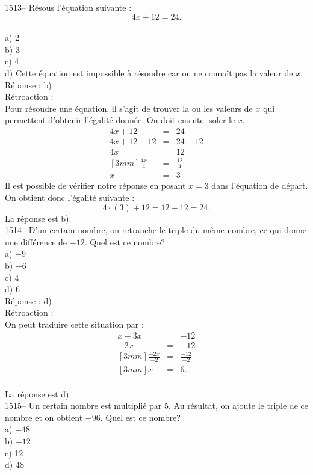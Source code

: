 1513-- R\'esous l'\'equation suivante :$$4x+12=24.$$\\
a) 2\\
b) 3\\
c) 4\\
d) Cette \'equation est impossible \`a r\'esoudre car on ne conna\^it pas la
valeur de $x$.\\

R\'eponse : b)\\

R\'etroaction :\\
Pour r\'esoudre une \'equation, il s'agit de trouver la ou les
valeurs de $x$ qui permettent d'obtenir l'\'egalit\'e donn\'ee. On
doit ensuite isoler le $x.$
\begin{eqnarray*}
4x+12&=&24 \\ 4x+12-12&=&24-12 \\ 4x &=& 12 \\  [3mm]
  \frac{4x}{4}&=&\frac{12}{4}\\[3mm]x&=&3
\end{eqnarray*}
Il est possible de v\'erifier notre r\'eponse en posant $x=3$ dans
l'\'equation de d\'epart. On obtient donc l'\'egalit\'e suivante
:$$4\cdot(3)+12=12+12=24.$$ La r\'eponse est
b).\\

1514-- D'un certain nombre, on retranche le triple du m\^eme nombre,
ce qui donne une
diff\'erence de $-12$. Quel est ce nombre?\\
a) $-9$\\
b) $-6$\\
c) 4\\
d) 6\\

R\'eponse : d)\\

R\'etroaction :\\
On peut traduire cette situation par :
\begin{eqnarray*}
x-3x&=&-12 \\ -2x&=&-12 \\ [3mm]\frac{-2x}{-2}&=& \frac{-12}{-2}\\
[3mm] x&=&6.
\end{eqnarray*}\\
La r\'eponse est d).\\

1515-- Un certain nombre est multipli\'e par 5. Au r\'esultat, on
ajoute le triple de
ce nombre et on obtient $-96$. Quel est ce nombre?\\
a) $-48$\\
b) $-12$\\
c) 12\\
d) 48\\


